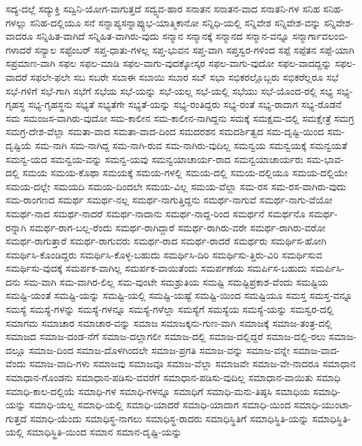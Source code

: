 {ಸದ್ಯ-ದಲ್ಲೆ
ಸದ್ಯುಕ್ತಿ
ಸದ್ವಿನಿ-ಯೋಗ-ವಾಗುತ್ತದೆ
ಸದ್ವ್ಯವ-ಹಾರ
ಸನಾತನ
ಸನಾತನ-ವಾದ
ಸನಾತನಿ-ಗಳ
ಸನಿಹ
ಸನಿಹ-ಗಳಲ್ಲು
ಸನಿಹ-ದಲ್ಲಿಯೂ
ಸನೆ
ಸನ್ನಾಪ್ಯಸನ್ನಾಪ್ಯುಭ-ಯಾತ್ಮಿಕಾನೋ
ಸನ್ನಿಧಿ-ಯಲ್ಲಿ
ಸನ್ನಿವೇಶ
ಸನ್ನಿವೇಶ-ವನ್ನು
ಸನ್ನಿವೇಶ-ವಾದರೂ
ಸನ್ನಿಹಿತ-ವಾಗಿದೆ
ಸನ್ನಿಹಿತ-ವಾಗಿರು-ವುದು
ಸನ್ಮಾನ
ಸನ್ಮಾನಕ್ಕೆ
ಸನ್ಮಾನದ
ಸನ್ಮಾನ-ವನ್ನೂ
ಸನ್ಮಾರ್ಗಾವಲಂಬಿ-ಗಳಾದರೆ
ಸನ್ಯಾಲ
ಸಪ್ಟೆಂಬರ್
ಸಪ್ತ-ಧಾತು-ಗಳಲ್ಲ
ಸಪ್ತ-ಭುವನ
ಸಪ್ತ-ವಾಗಿ
ಸಪ್ತಸ್ವರ-ಗಳಿಂದ
ಸಪ್ಪೆ
ಸಪ್ಪೆತನ
ಸಪ್ಪೆ-ಯಾಗಿ
ಸಪ್ರಮಾಣ-ವಾಗಿ
ಸಫಲ
ಸಫಲ-ಮಾಡಿ
ಸಫಲ-ವಾಗು-ವುದಕ್ಕೋಸ್ಕರ
ಸಫಲ-ವಾಗು-ವುದೋ
ಸಫಲ-ವಾದದ್ದನ್ನು
ಸಫಲ-ವಾದರೆ
ಸಫಲೇ-ಫಲೇ
ಸಬ
ಸಬರೇ
ಸಬಾಈ
ಸಬಾಯಿ
ಸಬಾರ
ಸಬ್
ಸಭಾ
ಸಭಿಕರಲ್ಲೊಬ್ಬರು
ಸಭಿಕರೆಲ್ಲರೂ
ಸಭೆ
ಸಭೆ-ಗಳಿಗೆ
ಸಭೆ-ಗಾಗಿ
ಸಭೆಗೆ
ಸಭೆಯ
ಸಭೆ-ಯನ್ನು
ಸಭೆ-ಯಲ್ಲ
ಸಭೆ-ಯಲ್ಲಿ
ಸಭೆಯು
ಸಭೆ-ಯೊಂದ-ರಲ್ಲಿ
ಸಭ್ಯ
ಸಭ್ಯ-ಗೃಹಸ್ಥ
ಸಭ್ಯ-ಗೃಹಸ್ಥನು
ಸಭ್ಯತೆ
ಸಭ್ಯತೆಗೇ
ಸಭ್ಯತೆ-ಯನ್ನು
ಸಭ್ಯ-ರಂತಿದ್ದರು
ಸಭ್ಯ-ರಂತೆ
ಸಭ್ಯ-ರಾದಾಗ
ಸಭ್ಯ-ರೊಡನೆ
ಸಮ
ಸಮಂಜಸ-ವಾಗಿರು-ವುದೋ
ಸಮ-ಕಾಲೀನ
ಸಮ-ಕಾಲೀನ-ನಾಗಿದ್ದನು
ಸಮಕ್ಕೆ
ಸಮಕ್ಷಮ-ದಲ್ಲಿ
ಸಮಕ್ಷೇತ್ರೆ
ಸಮಗ್ರ
ಸಮಗ್ರ-ದೇಶ-ವೆಲ್ಲಾ
ಸಮತಾ-ವಾದ
ಸಮತಾ-ವಾದ-ದಿಂದ
ಸಮದರಶನ
ಸಮದರ್ಶಿತ್ವದ
ಸಮ-ದೃಷ್ಟಿ-ಯಿಂದ
ಸಮ-ದೃಷ್ಟಿಯೆ
ಸಮ-ನಾಗಿ
ಸಮ-ನಾಗಿದ್ದ
ಸಮ-ನಾಗಿ-ರುವ
ಸಮ-ನಾಗಿರು-ವುದಿಲ್ಲ
ಸಮನ್ವಯ
ಸಮನ್ವಯಕ್ಕೆ
ಸಮನ್ವಯತೆ
ಸಮನ್ವ-ಯದ
ಸಮನ್ವಯ-ವನ್ನು
ಸಮನ್ವ-ಯವು
ಸಮನ್ವಯಾಚಾರ್ಯ-ರಾದ
ಸಮನ್ವಯಾಚಾರ್ಯರು
ಸಮ-ಭಾವ-ದಲ್ಲಿ
ಸಮಯ
ಸಮಯ-ಕೊಥಾ
ಸಮಯಕ್ಕೆ
ಸಮಯ-ಗಳಲ್ಲಿ
ಸಮಯ-ದಲ್ಲಿ
ಸಮಯ-ದಲ್ಲಿಯೂ
ಸಮಯ-ದಲ್ಲಿಯೇ
ಸಮಯ-ದಲ್ಲೇ
ಸಮಯದಿ
ಸಮಯ-ದಿಂದಲೇ
ಸಮಯ-ವಿಲ್ಲ
ಸಮಯ-ವೆಲ್ಲಾ
ಸಮ-ರಸ
ಸಮ-ರಸ-ವಾಗಿರು-ವುದು
ಸಮ-ರಾಂಗಣದ
ಸಮರ್ಥ
ಸಮರ್ಥ-ನಲ್ಲ
ಸಮರ್ಥ-ನಾಗುತ್ತಿದ್ದನು
ಸಮರ್ಥ-ನಾಗುವೆ
ಸಮರ್ಥ-ನಾಗು-ವೆಯೋ
ಸಮರ್ಥ-ನಾದ
ಸಮರ್ಥ-ನಾದರೆ
ಸಮರ್ಥ-ನಾದಾನು
ಸಮರ್ಥ-ನಾದ್ದ-ರಿಂದ
ಸಮರ್ಥನೆ
ಸಮರ್ಥನೊ
ಸಮರ್ಥ-ರನ್ನಾಗಿ
ಸಮರ್ಥ-ರಾಗ-ಬಲ್ಲ-ರೆಂದು
ಸಮರ್ಥ-ರಾಗಿದ್ದಾರೆ
ಸಮರ್ಥ-ರಾಗಿರು-ವರೇ
ಸಮರ್ಥ-ರಾಗಿರು-ವರೋ
ಸಮರ್ಥ-ರಾಗುತ್ತಾರೆ
ಸಮರ್ಥ-ರಾಗುವರು
ಸಮರ್ಥ-ರಾದ
ಸಮರ್ಥ-ರಾದರೆ
ಸಮರ್ಥರು
ಸಮರ್ಥಿಸ-ಹೋಗಿ
ಸಮರ್ಥಿಸಿ-ಕೊಂಡಿದ್ದರು
ಸಮರ್ಥಿಸಿ-ಕೊಳ್ಳ-ಬಹುದು
ಸಮರ್ಥಿಸಿ-ದಿರಿ
ಸಮರ್ಥಿಸು-ತ್ತಿರು-ವಿರಿ
ಸಮರ್ಥಿಸುವ
ಸಮರ್ಥಿಸು-ವುದಕ್ಕೆ
ಸಮರ್ಪಕ-ವಾಗಿಲ್ಲ
ಸಮರ್ಪಕ-ವಾಯಿತೆಂದು
ಸಮರ್ಪಣೆಯ
ಸಮರ್ಪಿಸ-ಬಹುದು
ಸಮರ್ಪಿಸಿ-ದನು
ಸಮ-ವಾಗಿ
ಸಮ-ವಾಗಿರ-ಲಿಲ್ಲ
ಸಮ-ವುಂಟೇ
ಸಮಶ್ರುತಿಯ
ಸಮಷ್ಟಿ
ಸಮಷ್ಟಿಪ್ರಕಾಶ-ವೆಂದು
ಸಮಷ್ಟಿಯ
ಸಮಷ್ಟಿ-ಯಂತೆ
ಸಮಷ್ಟಿ-ಯನ್ನು
ಸಮಷ್ಟಿ-ಯಲ್ಲಿ
ಸಮಷ್ಟಿ-ಯಷ್ಟೆ
ಸಮಷ್ಟಿ-ಯಿಂದ
ಸಮಷ್ಟಿಯೂ
ಸಮಸ್ತ
ಸಮಸ್ತ-ವನ್ನೂ
ಸಮಸ್ಯೆ
ಸಮಸ್ಯೆ-ಗಳನ್ನು
ಸಮಸ್ಯೆ-ಗಳನ್ನೂ
ಸಮಸ್ಯೆ-ಗಳೆಲ್ಲಾ
ಸಮಸ್ಯೆಗೆ
ಸಮಸ್ಯೆಯ
ಸಮಸ್ಯೆ-ಯನ್ನು
ಸಮಸ್ವರ-ದಲ್ಲಿ
ಸಮಾಗಮ
ಸಮಾಚಾರ
ಸಮಾಚಾರ-ವನ್ನು
ಸಮಾಜ
ಸಮಾಜಕ್ಕನು-ಗುಣ-ವಾಗಿ
ಸಮಾಜಕ್ಕೆ
ಸಮಾಜ-ತಂತ್ರ-ದಲ್ಲಿ
ಸಮಾಜದ
ಸಮಾಜ-ದಂಡ-ನೆಗೆ
ಸಮಾಜ-ದಲ್ಲಾಗಲೀ
ಸಮಾಜ-ದಲ್ಲಿ
ಸಮಾಜ-ದಲ್ಲಿದ್ದರೆ
ಸಮಾಜ-ದಲ್ಲಿ-ರಲು
ಸಮಾಜ-ದಲ್ಲೂ
ಸಮಾಜ-ದಿಂದ
ಸಮಾಜ-ದೊಳಗಿಂದಲೇ
ಸಮಾಜ-ಪ್ರಗತಿ
ಸಮಾಜ-ವನ್ನು
ಸಮಾಜ-ವನ್ನೇ
ಸಮಾಜ-ವಾದ-ವೆಂದು
ಸಮಾಜ-ವಾದಿ-ಗಳು
ಸಮಾಜವು
ಸಮಾಜವೂ
ಸಮಾಜ-ವೆಲ್ಲಾ
ಸಮಾಜವೇ
ಸಮಾಜ-ವೇ-ನಾದರೂ
ಸಮಾಧಾನ
ಸಮಾಧಾನ-ಗೊಂಡನು
ಸಮಾಧಾನ-ಪಡಿಸು-ವವರೆಗೆ
ಸಮಾಧಾನ-ಪಡಿಸು-ವುದಿಲ್ಲ
ಸಮಾಧಾನ-ವಾಯಿತು
ಸಮಾಧಿ
ಸಮಾಧಿ-ಕಾಲ-ದಲ್ಲಿಯೆ
ಸಮಾಧಿ-ಗಳ
ಸಮಾಧಿ-ಗಳನ್ನೂ
ಸಮಾಧಿಗೆ
ಸಮಾಧಿ-ಮನು-ತಿಷ್ಠಸಿ
ಸಮಾಧಿಯ
ಸಮಾಧಿ-ಯನ್ನು
ಸಮಾಧಿ-ಯಲ್ಲ
ಸಮಾಧಿ-ಯಲ್ಲಿ
ಸಮಾಧಿ-ಯಾದರೆ
ಸಮಾಧಿ-ಯಾದಾಗ
ಸಮಾಧಿ-ಯಿಂದ
ಸಮಾಧಿ-ಯುಂಟಾ-ಗುತ್ತದೆ
ಸಮಾಧಿ-ಯೆಂದು
ಸಮಾಧಿಸ್ಥ-ನಾಗಲು
ಸಮಾಧಿಸ್ಥ-ರಾದರು
ಸಮಾಧಿಸ್ಥಿತಿಗೆ
ಸಮಾಧಿಸ್ಥಿತಿ-ಯನ್ನು
ಸಮಾಧಿಸ್ಥಿತಿ-ಯಲ್ಲಿ
ಸಮಾಧಿಸ್ಥಿತಿ-ಯಿಂದ
ಸಮಾನ
ಸಮಾನ-ದೃಷ್ಟಿ-ಯನ್ನು
}
